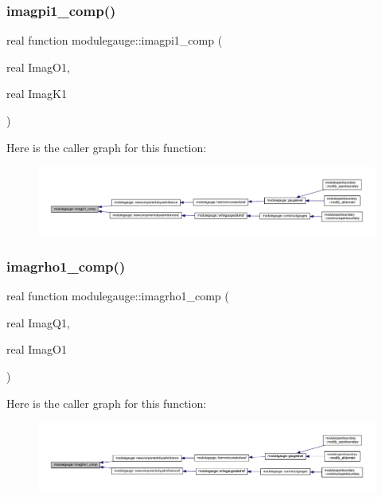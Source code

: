 \subsubsection{\texorpdfstring{imagpi1\+\_\+comp()}{imagpi1\_comp()}}
{\footnotesize\ttfamily real function modulegauge\+::imagpi1\+\_\+comp (\begin{DoxyParamCaption}\item[{real}]{Imag\+O1,  }\item[{real}]{Imag\+K1 }\end{DoxyParamCaption})\hspace{0.3cm}{\ttfamily [private]}}

Here is the caller graph for this function\+:\nopagebreak
\begin{figure}[H]
\begin{center}
\leavevmode
\includegraphics[width=350pt]{namespacemodulegauge_a71b5d5333c564a3344645bef85a9e75b_icgraph}
\end{center}
\end{figure}
\mbox{\label{namespacemodulegauge_ab3aa99d6bca64d01ca7e09d41c9bd6f9}} 
\subsubsection{\texorpdfstring{imagrho1\+\_\+comp()}{imagrho1\_comp()}}
{\footnotesize\ttfamily real function modulegauge\+::imagrho1\+\_\+comp (\begin{DoxyParamCaption}\item[{real}]{Imag\+Q1,  }\item[{real}]{Imag\+O1 }\end{DoxyParamCaption})\hspace{0.3cm}{\ttfamily [private]}}

Here is the caller graph for this function\+:\nopagebreak
\begin{figure}[H]
\begin{center}
\leavevmode
\includegraphics[width=350pt]{namespacemodulegauge_ab3aa99d6bca64d01ca7e09d41c9bd6f9_icgraph}
\end{center}
\end{figure}
\mbox{\label{namespacemodulegauge_af07cc0a3df0d15cac79f031de3fb79a7}} 
